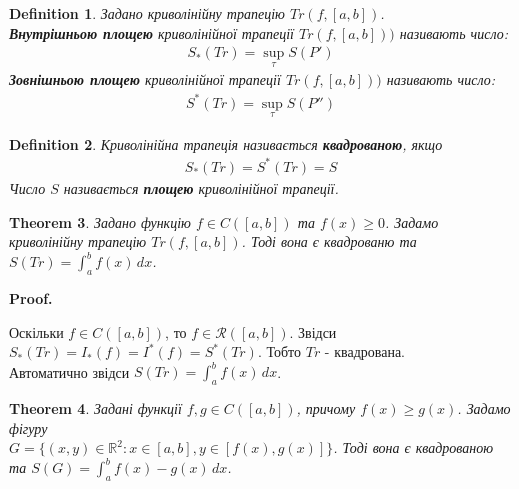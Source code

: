 \documentclass[a4paper, 10pt]{article}
\makeatletter
\def\huge{\displaystyle}
\def\qed{$\blacksquare$}
\theoremstyle{theoremdd}
\newtheorem{theorem}{Theorem}[subsection]
\theoremstyle{theoremdd}
\newtheorem{definition}[theorem]{Definition}
\theoremstyle{theoremdd}
\theoremstyle{theoremdd}
\theoremstyle{theoremdd}
\theoremstyle{theoremdd}
\theoremstyle{theoremdd}
\theoremstyle{theoremdd}
\renewenvironment{proof}[1][Proof.\\]{\par
\pushQED{\hfill \qed}%
\normalfont \topsep6\p@\@plus6\p@\relax
\trivlist
\item\relax
{\bfseries
#1\@addpunct{.}}\hspace\labelsep\ignorespaces
}{%
\popQED\endtrivlist\@endpefalse
}
\makeatother
\begin{document}
\begin{definition} Задано криволінійну трапецію $Tr(f,[a,b])$.\\
\textbf{Внутрішньою площею} криволінійної трапеції $Tr(f,[a,b]))$ називають число:
\begin{align*}
S_*(Tr) = \huge\sup_{\tau} S(P')
\end{align*}
\textbf{Зовнішньою площею} криволінійної трапеції $Tr(f,[a,b]))$ називають число:
\begin{align*}
S^*(Tr) = \huge\sup_{\tau} S(P'')
\end{align*}
\end{definition}

\begin{definition}
Криволінійна трапеція називається \textbf{квадрованою}, якщо
\begin{align*}
S_*(Tr) = S^*(Tr) = S
\end{align*}
Число $S$ називається \textbf{площею} криволінійної трапеції.
\end{definition}

\begin{theorem}
Задано функцію $f \in C([a,b])$ та $f(x) \geq 0$. Задамо криволінійну трапецію $Tr(f,[a,b])$. Тоді вона є квадрованю та $S(Tr) = \huge\int_a^b f(x)\,dx$.
\end{theorem}

\begin{proof}
Оскільки $f \in C([a,b])$, то $f \in \mathcal{R}([a,b])$. Звідси $S_*(Tr) = I_*(f) = I^*(f) = S^*(Tr)$. Тобто $Tr$ - квадрована.\\
Автоматично звідси $S(Tr) = \huge\int_a^b f(x)\,dx$.
\end{proof}

\begin{theorem}
Задані функції $f,g \in C([a,b])$, причому $f(x) \geq g(x)$. Задамо фігуру \\ $G = \{(x,y) \in \mathbb{R}^2: x \in [a,b], y \in [f(x),g(x)]\}$. Тоді вона є квадрованою та $S(G) = \huge\int_a^b f(x)-g(x)\,dx$.\\
\end{theorem}
\end{document}
